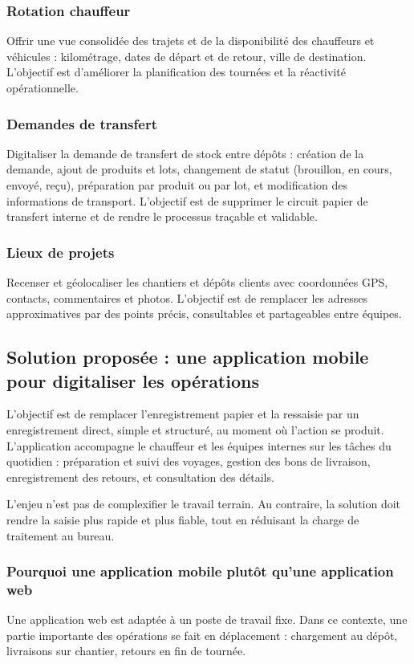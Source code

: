 \documentclass[12pt,a4paper]{article}
\begin{document}
    \subsubsection{Rotation chauffeur}
    Offrir une vue consolidée des trajets et de la disponibilité des chauffeurs et véhicules : kilométrage, dates de départ et de retour, ville de destination. L'objectif est d'améliorer la planification des tournées et la réactivité opérationnelle.

    \subsubsection{Demandes de transfert}
    Digitaliser la demande de transfert de stock entre dépôts : création de la demande, ajout de produits et lots, changement de statut (brouillon, en cours, envoyé, reçu), préparation par produit ou par lot, et modification des informations de transport. L'objectif est de supprimer le circuit papier de transfert interne et de rendre le processus traçable et validable.

    \subsubsection{Lieux de projets}
    Recenser et géolocaliser les chantiers et dépôts clients avec coordonnées GPS, contacts, commentaires et photos. L'objectif est de remplacer les adresses approximatives par des points précis, consultables et partageables entre équipes.

    \subsection{Solution proposée : une application mobile pour digitaliser les opérations}
    L'objectif est de remplacer l'enregistrement papier et la ressaisie par un enregistrement direct, simple et structuré, au moment où l'action se produit. L'application accompagne le chauffeur et les équipes internes sur les tâches du quotidien : préparation et suivi des voyages, gestion des bons de livraison, enregistrement des retours, et consultation des détails.

    L'enjeu n'est pas de complexifier le travail terrain. Au contraire, la solution doit rendre la saisie plus rapide et plus fiable, tout en réduisant la charge de traitement au bureau.

    \subsubsection{Pourquoi une application mobile plutôt qu'une application web}
    Une application web est adaptée à un poste de travail fixe. Dans ce contexte, une partie importante des opérations se fait en déplacement : chargement au dépôt, livraisons sur chantier, retours en fin de tournée.
\end{document}
